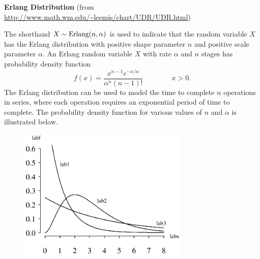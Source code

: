 \documentclass[12pt,fullpage]{article}
\begin{document}
\noindent
{\bf Erlang Distribution} (from \color{blue}\url{http://www.math.wm.edu/~leemis/chart/UDR/UDR.html}\color{black})

\noindent
The shorthand $X \sim {\rm Erlang}(n,\alpha)$ is used to indicate that the
random variable $X$ has the Erlang distribution with positive shape parameter $n$ and positive scale parameter $\alpha$.
An Erlang random variable $X$ with rate $\alpha$ and $n$ stages has probability density function 
$$
f(x) =\frac{x ^ {n - 1} e ^ {-x / \alpha}} {\alpha ^ {n} (n - 1) !} \qquad \qquad x > 0.
$$
The Erlang distribution can be used to model the time to complete $n$ operations
in series, where each operation requires an exponential period of time to complete.
The probability density function for various values of $n$ and $\alpha$ is
illustrated below.

\begin{figure}[h!]
\begin{center}
\includegraphics[width=3.2in]{ErlangPlot.ps}
\end{center}
\end{figure}
\end{document}
